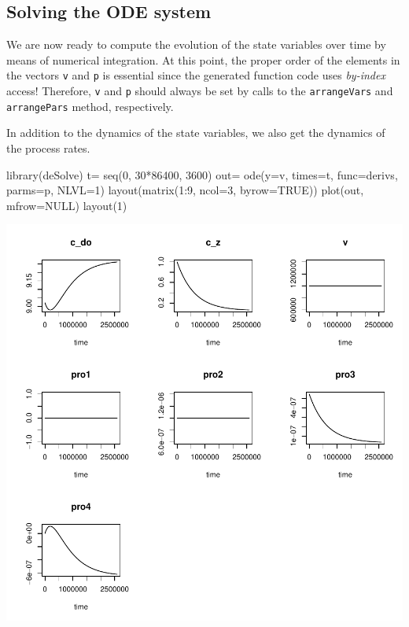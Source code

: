 \documentclass[times,onecolumn]{article}
\begin{document}
\subsection{Solving the ODE system}

We are now ready to compute the evolution of the state variables over time by means of numerical integration. At this point, the proper order of the elements in the vectors \verb|v| and \verb|p| is essential since the generated function code uses \emph{by-index} access! Therefore, \verb|v| and \verb|p| should always be set by calls to the \verb|arrangeVars| and \verb|arrangePars| method, respectively.

In addition to the dynamics of the state variables, we also get the dynamics of the process rates.

\begin{Schunk}
\begin{Sinput}
 library(deSolve)
 t= seq(0, 30*86400, 3600)
 out= ode(y=v, times=t, func=derivs, parms=p, NLVL=1)
 layout(matrix(1:9, ncol=3, byrow=TRUE))
 plot(out, mfrow=NULL)
 layout(1)
\end{Sinput}
\end{Schunk}
\includegraphics{rodeo-013}

\end{document}
